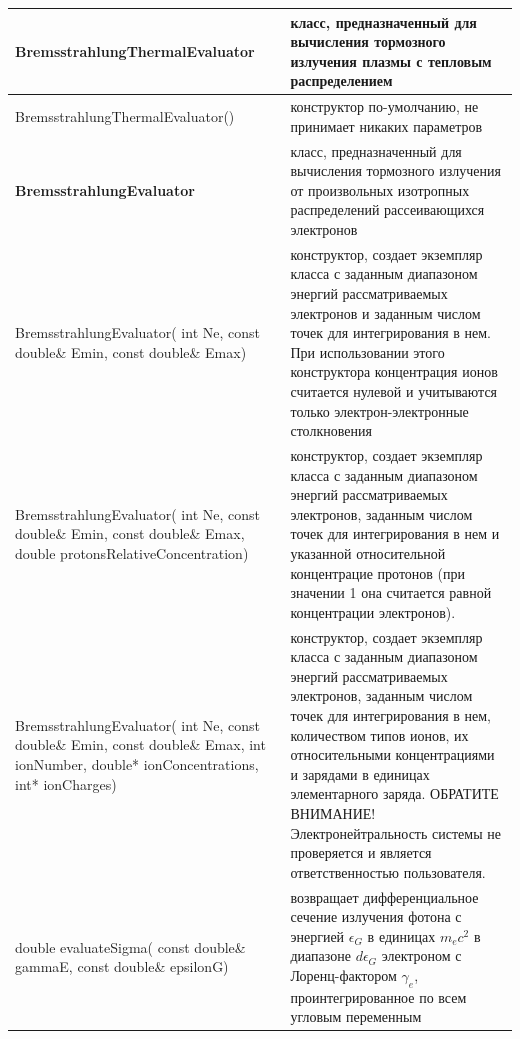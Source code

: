 \begin{small}
	\label{bremsstrahlung}
	\begin{xtabular}{|p{0.48\textwidth}|p{0.52\textwidth}|}  
		\hline
		\textbf{BremsstrahlungThermalEvaluator} & класс, предназначенный для вычисления тормозного излучения плазмы с тепловым распределением\\
		\hline
		BremsstrahlungThermalEvaluator() & конструктор по-умолчанию, не принимает никаких параметров\\
		\hline
		\textbf{BremsstrahlungEvaluator} & класс, предназначенный для вычисления тормозного излучения от произвольных изотропных распределений рассеивающихся электронов\\
		\hline
		BremsstrahlungEvaluator( int Ne, const double\& Emin, const double\& Emax) & конструктор, создает экземпляр класса с  заданным диапазоном энергий рассматриваемых электронов и заданным числом точек для интегрирования в нем. При использовании этого конструктора концентрация ионов считается нулевой и учитываются только электрон-электронные столкновения\\
		\hline
		BremsstrahlungEvaluator( int Ne, const double\& Emin, const double\& Emax, double protonsRelativeConcentration) & конструктор, создает экземпляр класса с  заданным диапазоном энергий рассматриваемых электронов, заданным числом точек для интегрирования в нем и указанной относительной концентрацие протонов (при значении 1 она считается равной концентрации электронов).\\
		\hline
		BremsstrahlungEvaluator( int Ne, const double\& Emin, const double\& Emax, int ionNumber, double* ionConcentrations, int* ionCharges) & конструктор, создает экземпляр класса с  заданным диапазоном энергий рассматриваемых электронов, заданным числом точек для интегрирования в нем, количеством типов ионов, их относительными концентрациями и зарядами в единицах элементарного заряда. ОБРАТИТЕ ВНИМАНИЕ! Электронейтральность системы не проверяется и является ответственностью пользователя.\\
		\hline
		double evaluateSigma( const double\& gammaE, const double\& epsilonG) & возвращает дифференциальное сечение излучения фотона с энергией $\epsilon_G$ в единицах $m_e c^2$ в диапазоне $d\epsilon_G$ электроном с Лоренц-фактором $\gamma_e$, проинтегрированное по всем угловым переменным\\
		\hline
	\end{xtabular}
\end{small}

